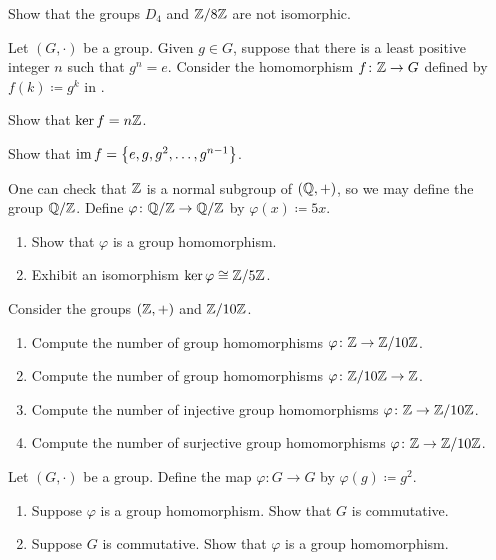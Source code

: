 \documentclass[../main.tex]{subfiles}
\begin{document}
\begin{homework}
    Show that the groups $D_4$ and $\mathbb Z/8\mathbb Z$ are not isomorphic.
\end{homework}

\begin{homework}
    Let $(G,\cdot)$ be a group. Given $g\in G$, suppose that there is a least positive integer $n$ such that $g^n=e$. Consider the homomorphism $f\colon\mathbb Z\to G$ defined by $f(k)\coloneqq g^k$ in .
    \begin{listalph}
        \item Show that $\ker f=n\mathbb Z$.
        \item Show that $\operatorname{im} f=\left\{e,g,g^2,\ldots,g^{n-1}\right\}$.
    \end{listalph}
\end{homework}

\begin{homework}
    One can check that $\mathbb Z$ is a normal subgroup of $(\mathbb Q,+)$, so we may define the group $\mathbb Q/\mathbb Z$. Define $\varphi\colon\mathbb Q/\mathbb Z\to\mathbb Q/\mathbb Z$ by $\varphi(x)\coloneqq 5x$.
    \begin{enumerate}[label=(\alph*)]
        \item Show that $\varphi$ is a group homomorphism.
        \item Exhibit an isomorphism $\ker\varphi\cong\mathbb Z/5\mathbb Z$.
    \end{enumerate}
\end{homework}

\begin{homework}
    Consider the groups $(\mathbb Z,+)$ and $\mathbb Z/10\mathbb Z$.
    \begin{enumerate}[label=(\alph*)]
        \item Compute the number of group homomorphisms $\varphi\colon\mathbb Z\to\mathbb Z/10\mathbb Z$.
        \item Compute the number of group homomorphisms $\varphi\colon\mathbb Z/10\mathbb Z\to\mathbb Z$.
        \item Compute the number of injective group homomorphisms $\varphi\colon\mathbb Z\to\mathbb Z/10\mathbb Z$.
        \item Compute the number of surjective group homomorphisms $\varphi\colon\mathbb Z\to\mathbb Z/10\mathbb Z$.
    \end{enumerate}
\end{homework}

\begin{homework}
    Let $(G,\cdot)$ be a group. Define the map $\varphi\colon G\to G$ by $\varphi(g)\coloneqq g^2$.
    \begin{enumerate}[label=(\alph*)]
        \item Suppose $\varphi$ is a group homomorphism. Show that $G$ is commutative.
        \item Suppose $G$ is commutative. Show that $\varphi$ is a group homomorphism.
    \end{enumerate}
\end{homework}
\end{document}

